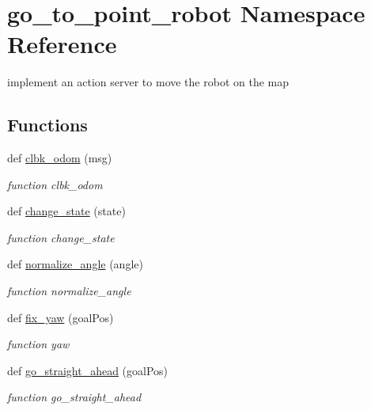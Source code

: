 \hypertarget{namespacego__to__point__robot}{}\section{go\+\_\+to\+\_\+point\+\_\+robot Namespace Reference}
\label{namespacego__to__point__robot}


implement an action server to move the robot on the map  


\subsection*{Functions}
\begin{DoxyCompactItemize}
\item 
def \hyperlink{namespacego__to__point__robot_a03165218d1637827cb202d3df2d5c782}{clbk\+\_\+odom} (msg)
\begin{DoxyCompactList}\small\item\em function clbk\+\_\+odom \end{DoxyCompactList}\item 
def \hyperlink{namespacego__to__point__robot_a7dc82840479105130238b2bad7f4e927}{change\+\_\+state} (state)
\begin{DoxyCompactList}\small\item\em function change\+\_\+state \end{DoxyCompactList}\item 
def \hyperlink{namespacego__to__point__robot_ae86d8ad9123b9ac0987b894814891c0e}{normalize\+\_\+angle} (angle)
\begin{DoxyCompactList}\small\item\em function normalize\+\_\+angle \end{DoxyCompactList}\item 
def \hyperlink{namespacego__to__point__robot_a3eea0827fcd59a4b5e6d525ab88e12ea}{fix\+\_\+yaw} (goal\+Pos)
\begin{DoxyCompactList}\small\item\em function yaw \end{DoxyCompactList}\item 
def \hyperlink{namespacego__to__point__robot_a12132668e9be07f4bbaf7211864da3c7}{go\+\_\+straight\+\_\+ahead} (goal\+Pos)
\begin{DoxyCompactList}\small\item\em function go\+\_\+straight\+\_\+ahead \end{DoxyCompactList}\item 

\end{DoxyCompactItemize}
